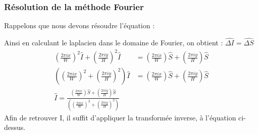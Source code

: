 \subsubsection{Résolution de la méthode Fourier}
Rappelons que nous devons résoudre l'équation : 

Ainsi en calculant le laplacien dans le domaine de Fourier, on obtient  : $\widehat{\Delta I} = \widehat{\Delta S}$
\begin{equation}
\begin{aligned}
\left(\frac{2\pi i x}{W}\right)^2 \widehat{I}+\left(\frac{2\pi i y}{H}\right)^2 \widehat{I} & = \left(\frac{2\pi i x}{W}\right) \widehat{S}+\left(\frac{2\pi i y}{H}\right) \widehat{S}\\
\left(\left(\frac{2\pi i x}{W}\right)^2+\left(\frac{2\pi i y}{H}\right)^2\right) \widehat{I} & = \left(\frac{2\pi i x}{W}\right) \widehat{S}+\left(\frac{2\pi i y}{H}\right) \widehat{S}\\
\widehat{I} = \frac{\left(\frac{2\pi i x}{W}\right) \widehat{S}+\left(\frac{2\pi i y}{H}\right) \widehat{S}}{\left(\left(\frac{2\pi i x}{W}\right)^2+\left(\frac{2\pi i y}{H}\right)^2\right)}
\end{aligned}
\end{equation}
Afin de retrouver I, il suffit d'appliquer la transformée inverse, à l'équation ci-dessus.